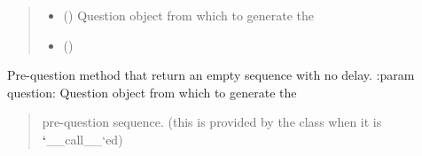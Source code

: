 \documentclass[letterpaper,10pt,english]{sphinxmanual}
\begin{document}
\begin{fulllineitems}
\begin{fulllineitems}
\begin{quote}
\begin{description}
\begin{itemize}
\item {} 
 () \textendash{} Question object from which to generate the

\item {} 
 () \textendash{} 

\end{itemize}

\end{description}\end{quote}

\end{fulllineitems}


\end{fulllineitems}


\begin{fulllineitems}
\label{\detokenize{index:birdears.prequestion.none}}
Pre-question method that return an empty sequence with no delay.
:param question: Question object from which to generate the
\begin{quote}

pre-question sequence. (this is provided by the  class
when it is {\color{red}\bfseries{}{}`}\_\_call\_\_{}`ed)
\end{quote}
\begin{quote}\begin{description}
\end{description}\end{quote}

\end{fulllineitems}

\end{document}
